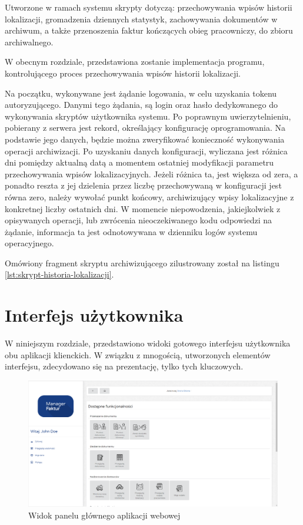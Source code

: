 Utworzone w ramach systemu skrypty dotyczą: przechowywania wpisów historii lokalizacji, gromadzenia dziennych statystyk, zachowywania dokumentów w archiwum, a także przenoszenia faktur kończących obieg pracowniczy, do zbioru archiwalnego.

W obecnym rozdziale, przedstawiona zostanie implementacja programu, kontrolującego proces przechowywania wpisów historii lokalizacji.

Na początku, wykonywane jest żądanie logowania, w celu uzyskania tokenu autoryzującego. Danymi tego żądania, są login oraz hasło dedykowanego do wykonywania skryptów użytkownika systemu. Po poprawnym uwierzytelnieniu, pobierany z serwera jest rekord, określający konfigurację oprogramowania. Na podstawie jego danych, będzie można zweryfikować konieczność wykonywania operacji archiwizacji. Po uzyskaniu danych konfiguracji, wyliczana jest różnica dni pomiędzy aktualną datą a momentem ostatniej modyfikacji parametru przechowywania wpisów lokalizacyjnych. Jeżeli różnica ta, jest większa od zera, a ponadto reszta z jej dzielenia przez liczbę przechowywaną w konfiguracji jest równa zero, należy wywołać punkt końcowy, archiwizujący wpisy lokalizacyjne z konkretnej liczby ostatnich dni. W momencie niepowodzenia, jakiejkolwiek z opisywanych operacji, lub zwrócenia nieoczekiwanego kodu odpowiedzi na żądanie, informacja ta jest odnotowywana w dzienniku logów systemu operacyjnego. 

Omówiony fragment skryptu archiwizującego zilustrowany został na listingu \ref{lst:skrypt-historia-lokalizacji}.

\section{Interfejs użytkownika}
W niniejszym rozdziale, przedstawiono widoki gotowego interfejsu użytkownika obu aplikacji klienckich. W związku z mnogością, utworzonych elementów interfejsu, zdecydowano się na prezentację, tylko tych kluczowych.

\begin{figure}[ht]
 \centering
  \includegraphics[width=0.95\linewidth]{rys04/zrzut1}
 \caption{Widok panelu głównego aplikacji webowej}
 \label{fig:gui-webowa-zrzut1}
\end{figure}

